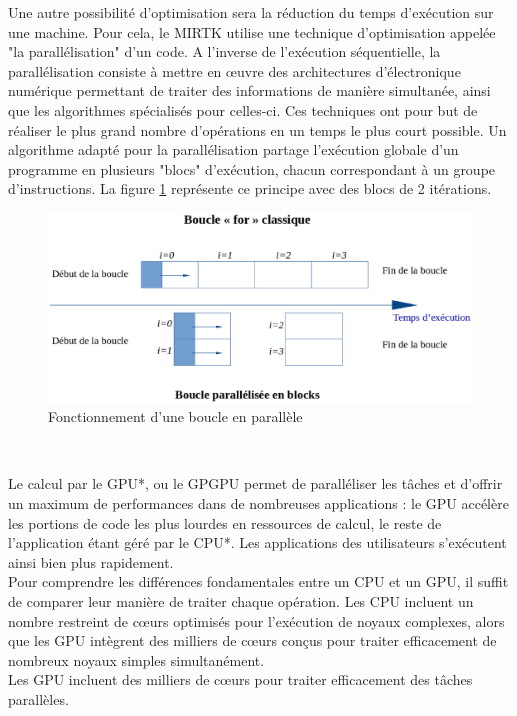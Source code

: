 \documentclass[10pt]{report}
\begin{document}
	Une autre possibilité d'optimisation sera la réduction du temps d'exécution sur une machine. Pour cela, le MIRTK utilise une technique d'optimisation appelée "la parallélisation" d'un code. 
	A l'inverse de l'exécution séquentielle, la parallélisation consiste à mettre en œuvre des architectures d'électronique numérique permettant de traiter des informations de manière simultanée, ainsi que les algorithmes spécialisés pour celles-ci. Ces techniques ont pour but de réaliser le plus grand nombre d'opérations en un temps le plus court possible.
	Un algorithme adapté pour la parallélisation partage l'exécution globale d'un programme en plusieurs "blocs" d'exécution, chacun correspondant à un groupe d'instructions. La figure \ref{Fonctionnement d'une boucle en parallèle} représente ce principe avec des blocs de 2 itérations.
	\begin{figure}[h!]
		\begin{center}
			\includegraphics[width=14cm]{Reports/figures/gfor.eps}	
		\end{center}
		\caption{Fonctionnement d'une boucle en parallèle}
		\label{Fonctionnement d'une boucle en parallèle}
	\end{figure}
	~\par
	Le calcul par le GPU*, ou le GPGPU permet de paralléliser les tâches et d'offrir un maximum de performances dans de nombreuses applications : le GPU accélère les portions de code les plus lourdes en ressources de calcul, le reste de l'application étant géré par le CPU*. Les applications des utilisateurs s'exécutent ainsi bien plus rapidement.\\
	Pour comprendre les différences fondamentales entre un CPU et un GPU, il suffit de comparer leur manière de traiter chaque opération. Les CPU incluent un nombre restreint de cœurs optimisés pour l'exécution de noyaux complexes, alors que les GPU intègrent des milliers de cœurs conçus pour traiter efficacement de nombreux noyaux simples simultanément.\\
	Les GPU incluent des milliers de cœurs pour traiter efficacement des tâches parallèles. \\ 
	 
\end{document}
